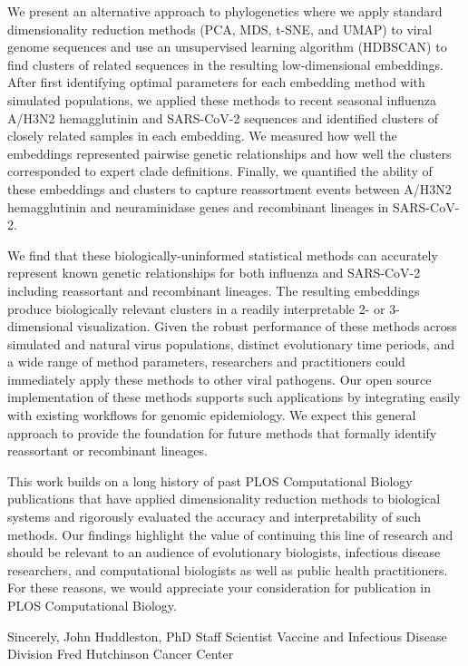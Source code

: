 \documentclass[11pt]{article}
\begin{document}
We present an alternative approach to phylogenetics where we apply standard dimensionality reduction methods (PCA, MDS, t-SNE, and UMAP) to viral genome sequences and use an unsupervised learning algorithm (HDBSCAN) to find clusters of related sequences in the resulting low-dimensional embeddings.
After first identifying optimal parameters for each embedding method with simulated populations, we applied these methods to recent seasonal influenza A/H3N2 hemagglutinin and SARS-CoV-2 sequences and identified clusters of closely related samples in each embedding.
We measured how well the embeddings represented pairwise genetic relationships and how well the clusters corresponded to expert clade definitions.
Finally, we quantified the ability of these embeddings and clusters to capture reassortment events between A/H3N2 hemagglutinin and neuraminidase genes and recombinant lineages in SARS-CoV-2.

We find that these biologically-uninformed statistical methods can accurately represent known genetic relationships for both influenza and SARS-CoV-2 including reassortant and recombinant lineages.
The resulting embeddings produce biologically relevant clusters in a readily interpretable 2- or 3-dimensional visualization.
Given the robust performance of these methods across simulated and natural virus populations, distinct evolutionary time periods, and a wide range of method parameters, researchers and practitioners could immediately apply these methods to other viral pathogens.
Our open source implementation of these methods supports such applications by integrating easily with existing workflows for genomic epidemiology.
We expect this general approach to provide the foundation for future methods that formally identify reassortant or recombinant lineages.

This work builds on a long history of past PLOS Computational Biology publications that have applied dimensionality reduction methods to biological systems and rigorously evaluated the accuracy and interpretability of such methods.
Our findings highlight the value of continuing this line of research and should be relevant to an audience of evolutionary biologists, infectious disease researchers, and computational biologists as well as public health practitioners.
For these reasons, we would appreciate your consideration for publication in PLOS Computational Biology.

\vspace{0.3in} %

Sincerely, \newline
\vspace{0.05in} \newline
John Huddleston, PhD \newline
Staff Scientist \newline
Vaccine and Infectious Disease Division \newline
Fred Hutchinson Cancer Center
\end{document}
